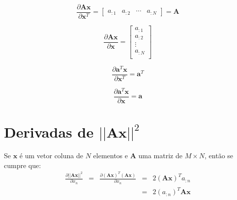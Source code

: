 \begin{corollaryT}
\begin{equation}
\frac{\partial \mathbf{A}\mathbf{x}}{\partial \mathbf{x}^{T}}=
\left[
\begin{matrix}
 a_{:1} &  a_{:2} &  \cdots &  a_{:N}
\end{matrix}
\right]=
\mathbf{A}
\end{equation}
\end{corollaryT}

\begin{corollaryT}
\begin{equation}
\frac{\partial \mathbf{A}\mathbf{x}}{\partial \mathbf{x}}=
\left[
\begin{matrix}
 a_{:1}\\
 a_{:2}\\
 \vdots\\
 a_{:N}\\
\end{matrix}
\right]
\end{equation}

\end{corollaryT}
\begin{corollaryT}
\begin{equation}
\frac{\partial \mathbf{a}^{T}\mathbf{x}}{\partial \mathbf{x}^{T}}=\mathbf{a}^{T}
\end{equation}
\end{corollaryT}

\begin{corollaryT}
\begin{equation}
\frac{\partial \mathbf{a}^{T}\mathbf{x}}{\partial \mathbf{x}}=\mathbf{a}
\end{equation}
\end{corollaryT}

\section{Derivadas de $||\mathbf{A}\mathbf{x}||^2$ 
}

\begin{theorem}
Se $\mathbf{x}$ é um vetor coluna de $N$ elementos e $\mathbf{A}$ uma matriz de $M\times N$, então se cumpre que:
\begin{equation}
\begin{matrix}
\frac{\partial ||\mathbf{A}\mathbf{x}||^2 }{\partial x_n}&=&
\frac{\partial \left(\mathbf{A}\mathbf{x}\right)^{T}\left(\mathbf{A}\mathbf{x}\right)}{\partial x_n}&=&
2\left(\mathbf{A}\mathbf{x}\right)^{T}a_{:n}\\
~&~&~&=& 2\left(a_{:n}\right)^{T}\mathbf{A}\mathbf{x}
\end{matrix}
\end{equation}
\end{theorem}

